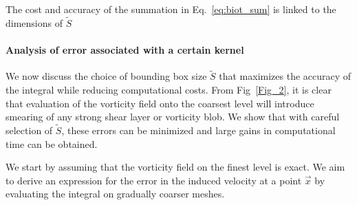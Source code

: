 \documentclass[preprint,12pt]{elsarticle}
\begin{document}
The cost and accuracy of the summation in Eq.~\ref{eq:biot_sum} is linked to the dimensions of $\tilde{S}$

\paragraph{Analysis of error associated with a certain kernel}

We now discuss the choice of bounding box size $\tilde{S}$ that maximizes the accuracy of the integral while reducing computational costs. From Fig~\ref{Fig_2}, it is clear that evaluation of the vorticity field onto the coarsest level will introduce smearing of any strong shear layer or vorticity blob. We show that with careful selection of $\tilde{S}$, these errors can be minimized and large gains in computational time can be obtained.

We start by assuming that the vorticity field on the finest level is exact. We aim to derive an expression for the error in the induced velocity at a point $\vec x$ by evaluating the integral on gradually coarser meshes.
\end{document}
